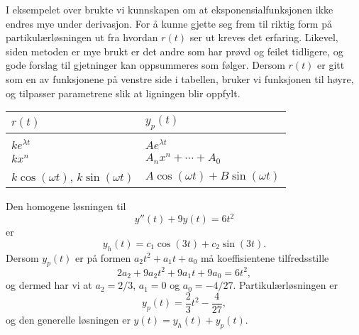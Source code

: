 \documentclass{article}
\theoremstyle{definition}
\newenvironment{ex}
{\pushQED{\qed}\renewcommand{\qedsymbol}{$\triangle$}\exx}
{\popQED\endexx}
\theoremstyle{remark}
\begin{document}
\begin{multicols*}{2}
I eksempelet over brukte vi kunnskapen om at eksponensialfunksjonen ikke endres mye under derivasjon. For å kunne gjette seg frem til riktig form på partikulærløsningen ut fra hvordan $r(t)$ ser ut kreves det erfaring. Likevel, siden metoden er mye brukt er det andre som har prøvd og feilet tidligere, og gode forslag til gjetninger kan oppsummeres som følger. Dersom $r(t)$ er gitt som en av funksjonene på venstre side i tabellen, bruker vi funksjonen til høyre, og tilpasser parametrene slik at ligningen blir oppfylt.

\begin{center}
  \begin{tabular}{m{} | m{}}
    $r(t)$ & $y_p(t)$ \\
    \hline \\
    $ke^{\lambda t}$ & $A e^{\lambda t}$ \\
    $k x^{n}$ & $A_n x^n + \cdots + A_0$ \\
    $k \cos(\omega t)$, $k \sin(\omega t)$ & \noindent\parbox[b]{\hsize}{$A \cos(\omega t) + B\sin(\omega t)$} \\
    $k e^{\lambda t} \cos(\omega t)$, $k e^{\lambda t} \sin(\omega t)$ & $e^{\lambda t} (A \cos(\omega t) + B\sin(\omega t))$ \\
  \end{tabular}
\end{center}

\begin{ex}
  Den homogene løsningen til
  \begin{equation*}
    y''(t) + 9 y(t) = 6t^2
  \end{equation*}
  er
  \begin{equation*}
    y_h(t) = c_1 \cos(3t) + c_2 \sin(3t).
  \end{equation*}
  Dersom $y_p(t)$ er på formen $a_2 t^2 + a_1 t + a_0$ må koeffisientene tilfredsstille
  \begin{equation*}
    2a_2 + 9a_2 t^2 + 9a_1 t + 9 a_0 = 6 t^2,
  \end{equation*}
  og dermed har vi at $a_2 = 2/3$, $a_1 = 0$ og $a_0 = - 4/27$. Partikulærløsningen er
  \begin{equation*}
    y_p(t) = \frac{2}{3} t^2 - \frac{4}{27},
  \end{equation*}
  og den generelle løsningen er $y(t) = y_h(t) + y_p(t)$.
\end{ex}


\end{multicols*}
\end{document}
